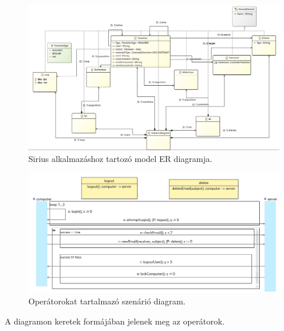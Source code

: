 \begin{figure}[!ht]
    \centering
    \includegraphics[width=150mm, keepaspectratio]{figures/sirius-minotor-erdiagram.png}
    \caption{Sirius alkalmazáshoz tartozó model ER diagramja.}
\end{figure}

\begin{figure}[!ht]
    \centering
    \includegraphics[width=150mm, keepaspectratio]{figures/diagramOperatorExample.png}
    \caption{Operátorokat tartalmazó szenárió diagram.}
\end{figure}

A diagramon keretek formájában jelenek meg az operátorok.